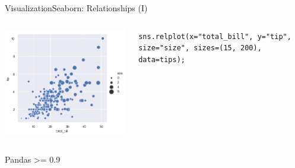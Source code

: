 \documentclass[10pt,compress]{beamer} %
\begin{document}
\begin{frame}[fragile]{Visualization}{Seaborn: Relationships (I)}
\begin{columns}[t]
	\includegraphics[width=\textwidth]{figs/sns-scatterplot3.png}\\
	\begin{exampleblock}{}
	\vspace{-0.2cm} 
	\begin{lstlisting}[basicstyle=\tiny]
	sns.relplot(x="total_bill", y="tip", size="size", sizes=(15, 200), data=tips);
	\end{lstlisting}
	\vspace{-0.2cm} 
	\end{exampleblock}

	\end{columns}

	Pandas >= 0.9
\end{frame}
\end{document}
